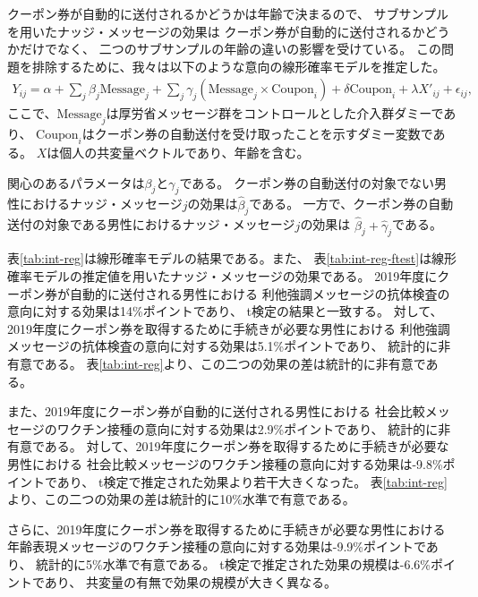 \documentclass[
  11pt,
  a4paper,
]{article}
\begin{document}
クーポン券が自動的に送付されるかどうかは年齢で決まるので、
サブサンプルを用いたナッジ・メッセージの効果は
クーポン券が自動的に送付されるかどうかだけでなく、
二つのサブサンプルの年齢の違いの影響を受けている。
この問題を排除するために、我々は以下のような意向の線形確率モデルを推定した。
\begin{align}
  Y_{ij} = \alpha + \sum_j \beta_j \text{Message}_j
           + \sum_j \gamma_j (\text{Message}_j \times \text{Coupon}_i)
           + \delta \text{Coupon}_i + \lambda X'_{ij} + \epsilon_{ij},
\end{align}
ここで、\(\text{Message}_j\)は厚労省メッセージ群をコントロールとした介入群ダミーであり、
\(\text{Coupon}_i\)はクーポン券の自動送付を受け取ったことを示すダミー変数である。
\(X\)は個人の共変量ベクトルであり、年齢を含む。

関心のあるパラメータは\(\beta_j\)と\(\gamma_j\)である。
クーポン券の自動送付の対象でない男性におけるナッジ・メッセージ\(j\)の効果は\(\hat{\beta}_j\)である。
一方で、クーポン券の自動送付の対象である男性におけるナッジ・メッセージ\(j\)の効果は
\(\hat{\beta}_j + \hat{\gamma}_j\)である。

表\ref{tab:int-reg}は線形確率モデルの結果である。また、
表\ref{tab:int-reg-ftest}は線形確率モデルの推定値を用いたナッジ・メッセージの効果である。
2019年度にクーポン券が自動的に送付される男性における
利他強調メッセージの抗体検査の意向に対する効果は14\%ポイントであり、
t検定の結果と一致する。
対して、2019年度にクーポン券を取得するために手続きが必要な男性における
利他強調メッセージの抗体検査の意向に対する効果は5.1\%ポイントであり、
統計的に非有意である。
表\ref{tab:int-reg}より、この二つの効果の差は統計的に非有意である。

また、2019年度にクーポン券が自動的に送付される男性における
社会比較メッセージのワクチン接種の意向に対する効果は2.9\%ポイントであり、
統計的に非有意である。
対して、2019年度にクーポン券を取得するために手続きが必要な男性における
社会比較メッセージのワクチン接種の意向に対する効果は-9.8\%ポイントであり、
t検定で推定された効果より若干大きくなった。
表\ref{tab:int-reg}より、この二つの効果の差は統計的に10\%水準で有意である。

さらに、2019年度にクーポン券を取得するために手続きが必要な男性における
年齢表現メッセージのワクチン接種の意向に対する効果は-9.9\%ポイントであり、
統計的に5\%水準で有意である。
t検定で推定された効果の規模は-6.6\%ポイントであり、
共変量の有無で効果の規模が大きく異なる。
\end{document}
